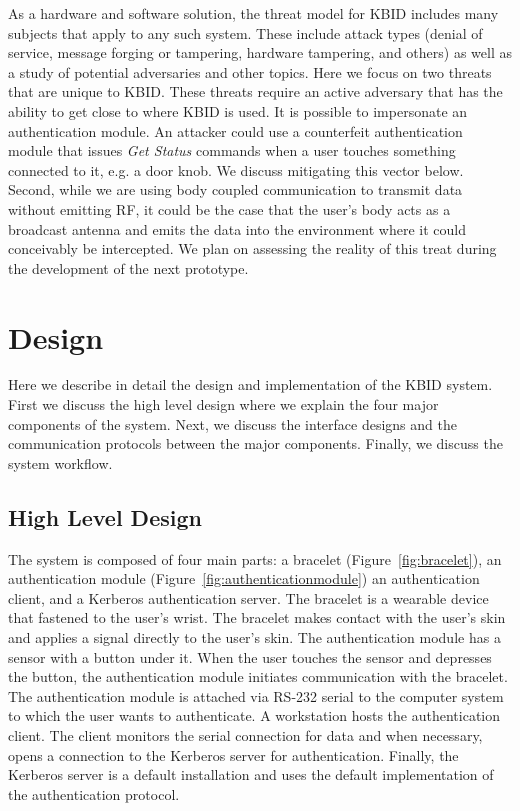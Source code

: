 \documentclass[runningheads,a4paper]{llncs}
\begin{document}
As a hardware and software solution, the threat model for KBID includes many subjects that apply to any such system.  These include attack types (denial of service, message forging or tampering, hardware tampering, and others) as well as a study of potential adversaries and other topics.  Here we focus on two threats that are unique to KBID.  These threats require an active adversary that has the ability to get close to where KBID is used.  It is possible to impersonate an authentication module.  An attacker could use a counterfeit authentication module that issues \emph{Get Status} commands when a user touches something connected to it, e.g. a door knob.  We discuss mitigating this vector below. Second, while we are using body coupled communication to transmit data without emitting RF, it could be the case that the user's body acts as a broadcast antenna and emits the data into the environment where it could conceivably be intercepted.  We plan on assessing the reality of this treat during the development of the next prototype.

\section{Design}\label{sec:Design}
Here we describe in detail the design and implementation of the KBID system.  First we discuss the high level design where we explain the four major components of the system.  Next, we discuss the interface designs and the communication protocols between the major components.  Finally, we discuss the system workflow.

\subsection{High Level Design}
The system is composed of four main parts: a bracelet (Figure~\ref{fig:bracelet}), an authentication module (Figure~\ref{fig:authenticationmodule}) an authentication client, and a Kerberos authentication server.  The bracelet is a wearable device that fastened to the user's wrist.  The bracelet makes contact with the user's skin and applies a signal directly to the user's skin.  The authentication module has a sensor with a button under it.  When the user touches the sensor and depresses the button, the authentication module initiates communication with the bracelet.  The authentication module is attached via RS-232 serial to the computer system to which the user wants to authenticate.  A workstation hosts the authentication client.  The client monitors the serial connection for data and when necessary, opens a connection to the Kerberos server for authentication.  Finally, the Kerberos server is a default installation and uses the default implementation of the authentication protocol.
\end{document}
